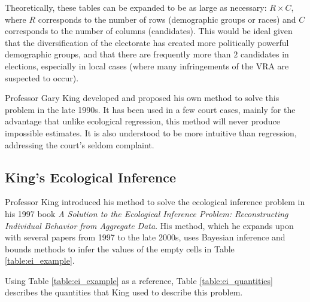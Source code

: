 Theoretically, these tables can be expanded to be as large as necessary: $R \times C$, where $R$ corresponds to the number of rows (demographic groups or races) and $C$ corresponds to the number of columns (candidates). This would be ideal given that the diversification of the electorate has created more politically powerful demographic groups, and that there are frequently more than $2$ candidates in elections, especially in local cases (where many infringements of the VRA are suspected to occur).

Professor Gary King developed and proposed his own method to solve this problem in the late 1990s. It has been used in a few court cases, mainly for the advantage that unlike ecological regression, this method will never produce impossible estimates. It is also understood to be more intuitive than regression, addressing the court's seldom complaint.

\subsection{King's Ecological Inference}

Professor King introduced his method to solve the ecological inference problem in his 1997 book \textit{A Solution to the Ecological Inference Problem: Reconstructing Individual Behavior from Aggregate Data}\cite{king1997}. His method, which he expands upon with several papers from 1997 to the late 2000s, uses Bayesian inference and bounds methods to infer the values of the empty cells in Table \ref{table:ei_example}.

Using Table \ref{table:ei_example} as a reference, Table \ref{table:ei_quantities} describes the quantities that King used to describe this problem\cite{king1999}.


